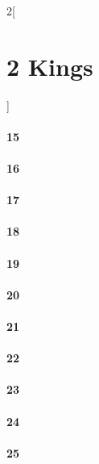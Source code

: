 \documentclass{book}
\begin{document}
\begin{multicols}{2}[\part{2 Kings}]
\subsection*{15}
\subsection*{16}
\subsection*{17}
\subsection*{18}
\subsection*{19}
\subsection*{20}
\subsection*{21}
\subsection*{22}
\subsection*{23}
\subsection*{24}
\subsection*{25}
\end{multicols}
\end{document}
